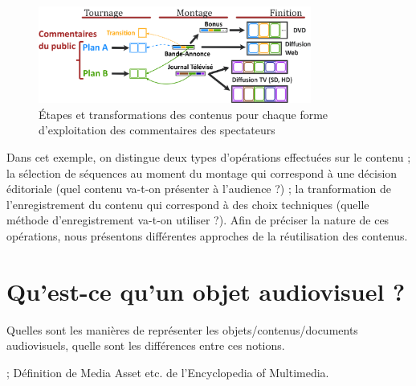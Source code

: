 \begin{figure}[ht!]
\centering
\includegraphics[width=0.8\textwidth]{images/EX-Content-Production-v7fr.png}
\caption{Étapes et transformations des contenus pour chaque forme d'exploitation des commentaires des spectateurs}
\label{img:intro:reuse-process}
\end{figure}

Dans cet exemple, on distingue deux types d'opérations effectuées sur le contenu ; 
la sélection de séquences au moment du montage qui correspond à une décision éditoriale (quel contenu va-t-on présenter à l'audience ?) ; 
la tranformation de l'enregistrement du contenu qui correspond à des choix techniques (quelle méthode d'enregistrement va-t-on utiliser ?).
Afin de préciser la nature de ces opérations, nous présentons différentes approches de la réutilisation des contenus.



\section{Qu'est-ce qu'un objet audiovisuel ?}\label{sec:dav}
Quelles sont les manières de représenter les objets/contenus/documents audiovisuels, quelle sont les différences entre ces notions.

\cite{Morizet-mahoudeaux2005a} ; Définition de Media Asset etc. de l'Encyclopedia of Multimedia.